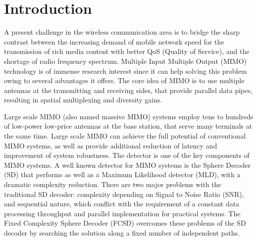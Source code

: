 \documentclass[letterpaper, 10pt, conference,twoside]{ieeeconf}
\begin{document}
\section{Introduction}
A present challenge in the wireless communication area is to bridge the sharp contrast between the increasing demand of mobile network speed for the transmission of rich media content with better QoS (Quality of Service), and the shortage of radio frequency spectrum. Multiple Input Multiple Output (MIMO) technology is of immense research interest since it can help solving this problem owing to several advantages it offers. The core idea of MIMO is to use multiple antennas at the transmitting and receiving sides, that provide parallel data pipes, resulting in spatial multiplexing and diversity gains\cite{oestges2010mimo}. 

Large scale MIMO (also named massive MIMO) systems employ tens to hundreds of low-power low-price antennas at the base station, that serve many terminals at the same time\cite{rusek2013scaling}. Large scale MIMO can achieve the full potential of conventional MIMO systems, as well as provide additional reduction of latency and improvement of system robustness. The detector is one of the key components of MIMO systems.
 A well known detector for MIMO systems is the Sphere Decoder (SD) that performs as well as a Maximum Likelihood detector (MLD), with a dramatic complexity reduction\cite{viterbo1999universal}\cite{hassibi2005sphere}. There are two major problems with the traditional SD decoder: complexity depending on Signal to Noise Ratio (SNR), and sequential nature, which conflict with the requirement of a constant data processing throughput and parallel implementation for practical systems. The Fixed Complexity Sphere Decoder (FCSD) overcomes these problems of the SD decoder by searching the solution along a fixed number of independent paths\cite{barbero2008fixing}.
 
\end{document}
